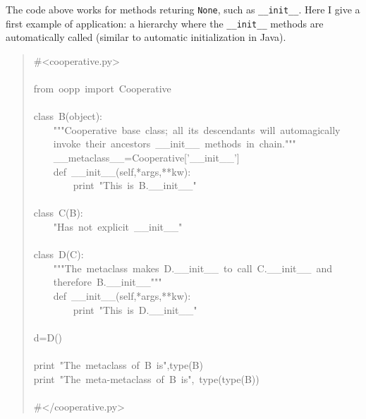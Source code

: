 \documentclass[10pt,english]{article}
\begin{document}
The code above works for methods returing \texttt{None}, such as \texttt{{\_}{\_}init{\_}{\_}}.
Here I give a first example of application: a hierarchy where the \texttt{{\_}{\_}init{\_}{\_}}
methods are automatically called (similar to automatic initialization
in Java).
\begin{quote}
\begin{ttfamily}\begin{flushleft}
\mbox{{\#}<cooperative.py>}\\
\mbox{}\\
\mbox{from~oopp~import~Cooperative}\\
\mbox{}\\
\mbox{class~B(object):}\\
\mbox{~~~~"""Cooperative~base~class;~all~its~descendants~will~automagically~}\\
\mbox{~~~~invoke~their~ancestors~{\_}{\_}init{\_}{\_}~methods~in~chain."""}\\
\mbox{~~~~{\_}{\_}metaclass{\_}{\_}=Cooperative['{\_}{\_}init{\_}{\_}']}\\
\mbox{~~~~def~{\_}{\_}init{\_}{\_}(self,*args,**kw):}\\
\mbox{~~~~~~~~print~"This~is~B.{\_}{\_}init{\_}{\_}"}\\
\mbox{}\\
\mbox{class~C(B):}\\
\mbox{~~~~"Has~not~explicit~{\_}{\_}init{\_}{\_}"}\\
\mbox{}\\
\mbox{class~D(C):}\\
\mbox{~~~~"""The~metaclass~makes~D.{\_}{\_}init{\_}{\_}~to~call~C.{\_}{\_}init{\_}{\_}~and~}\\
\mbox{~~~~therefore~B.{\_}{\_}init{\_}{\_}"""}\\
\mbox{~~~~def~{\_}{\_}init{\_}{\_}(self,*args,**kw):}\\
\mbox{~~~~~~~~print~"This~is~D.{\_}{\_}init{\_}{\_}"}\\
\mbox{}\\
\mbox{d=D()}\\
\mbox{}\\
\mbox{print~"The~metaclass~of~B~is",type(B)}\\
\mbox{print~"The~meta-metaclass~of~B~is",~type(type(B))}\\
\mbox{}\\
\mbox{{\#}</cooperative.py>}
\end{flushleft}\end{ttfamily}
\end{quote}
\end{document}
